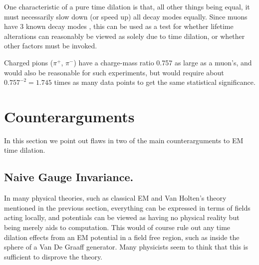 
One characteristic of a pure time dilation is that, all other things being equal,
it must necessarily slow down (or speed up) all decay modes equally.
Since muons have 3 known decay modes \cite{PDG2014}, this can be used as a test
for whether lifetime alterations can reasonably be viewed as solely due to time dilation,
or whether other factors must be invoked.

Charged pions ($\pi^+$, $\pi^-$) have a charge-mass ratio 0.757 as large as a muon's,
and would also be reasonable for such experiments, but would require about
$0.757^{-2} = 1.745$ times as many data points to get the same statistical significance.

\section{Counterarguments}
\label{sec:6}

In this section we point out flaws in two of the main counterarguments to EM time dilation.

\subsection{Naive Gauge Invariance.}

In many physical theories,
such as classical EM and Van Holten's theory mentioned in the previous section,
everything can be expressed in terms of fields acting locally,
and potentials can be viewed as having no physical reality but being merely aids to computation.
This would of course rule out any time dilation effects from an EM potential in a field free region,
such as inside the sphere of a Van De Graaff generator.
Many physicists seem to think that this is sufficient to disprove the theory.

